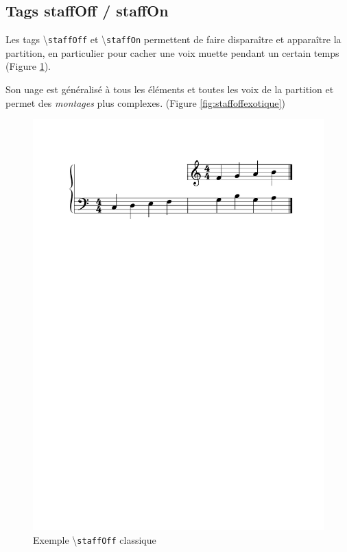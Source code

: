 \documentclass{article}
\newenvironment{gmncode}	{\vspace{-2mm}\small\verbatim}{\endverbatim\vspace{-2mm}}
\newcommand{\code}[1]		{{\small \texttt{#1}}}
\newcommand{\guidotag}[1]	{\textbackslash\code{#1}}
\begin{document}
\subsection{Tags staffOff / staffOn}\label{subsec:staffoff}

\vspace{2mm}
\begin{gmncode}
[ ... \staffOff ... \staffOn ... ]
\end{gmncode}



Les tags \guidotag{staffOff} et \guidotag{staffOn} permettent de faire disparaître et apparaître la partition, en particulier pour cacher une voix muette pendant un certain temps (Figure \ref{fig:staffoffsimple}).

Son uage est généralisé à tous les éléments et toutes les voix de la partition et permet des \emph{montages} plus complexes. (Figure \ref{fig:staffoffexotique})

\begin{figure}[h]
\centering
\includegraphics[width=\columnwidth]{img/staffoff.pdf}
\caption{ Exemple \guidotag{staffOff} classique}
\label{fig:staffoffsimple}
\end{figure}
\end{document}
